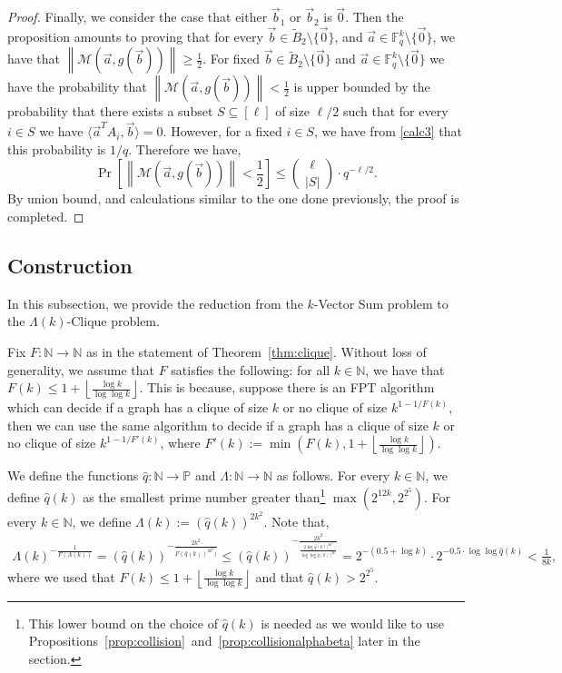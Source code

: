 \documentclass[11pt]{article}
\newcommand{\F}{\mathbb{F}}
\renewcommand{\ge}{ \geqslant}
\renewcommand{\le}{ \leqslant}
\renewcommand{\tilde}{\widetilde}
\newcommand{\M}{\mathcal{M}}
\begin{document}
\begin{proof}
Finally, we consider the case that either $\vec{b}_1$ or $\vec{b}_2$ is $\vec{0}$. Then the proposition amounts to proving that  for every   $\vec{b}\in \tilde{B}_2\setminus\{\vec{0}\}$, and  $\vec{a}\in\F_q^k\setminus\{\vec{0}\}$, we  have that  $\left\|\M\left(\vec{a},g(\vec{b})\right)\right\|\ge \frac{1}{2}$. For fixed   $\vec{b}\in \tilde{B}_2\setminus\{\vec{0}\}$ and  $\vec{a}\in\F_q^k\setminus\{\vec{0}\}$ we have the probability that $\left\|\M\left(\vec{a},g(\vec{b})\right)\right\|< \frac{1}{2}$ is upper bounded by the probability that there exists a subset  $S\subseteq [\ell]$ of size    $\ell /2$ such  that for every $i\in S$ we have $\langle \vec{a}^T A_i, \vec{b}\rangle= 0$. However, for a fixed $i\in S$, we have from \eqref{calc3} that  this probability is $1/q$.
Therefore we have, 
$$\Pr\left[\left\|\M\left(\vec{a},g(\vec{b})\right)\right\|< \frac{1}{2}\right]\le \binom{\ell }{|S|}\cdot q^{-\ell/2}.$$
By union bound, and calculations similar to the one done previously, the proof is completed. 
\end{proof}



 
\subsection{Construction} \label{sec:construction}

In this subsection, we provide the reduction from the $k$-Vector Sum problem to the $\Lambda(k)$-Clique problem. 

Fix $F:\mathbb{N}\to\mathbb{N}$ as in the statement of Theorem~\ref{thm:clique}.
Without loss of generality, we assume that  $F$  satisfies the following:   for all $k\in\mathbb{N}$, we have that $F(k)\le 1+\left\lfloor \frac{\log k}{\log\log k}\right\rfloor$. This is because, suppose there is an FPT algorithm   which can decide if a graph has a clique of size $k$ or no clique of size $k^{1-1/F(k)}$, then we can use the same algorithm to decide if  a graph has a clique of size $k$ or no clique of size $k^{1-1/F'(k)}$, where $F'(k):=\min\left(F(k),1+\left\lfloor \frac{\log k}{\log\log k}\right\rfloor\right)$.

 We define the functions 
$\hat{q}:\mathbb{N}\to\mathbb{P}$ and $\Lambda:\mathbb{N}\to\mathbb{N}$ as follows. For every $k\in\mathbb{N}$, we define $\hat{q}(k)$ as the smallest prime number greater than\footnote{This lower bound on the choice of $\hat{q}(k)$ is needed as we would like to use Propositions~\ref{prop:collision}~and~\ref{prop:collisionalphabeta} later in the section.} $\max\left(2^{12k},2^{2^5}\right)$. For every $k\in\mathbb{N}$, we define $\Lambda(k):=(\hat{q}(k))^{2k^2}$. Note that, 
\begin{align}
	\Lambda(k)^{-\frac{1}{F(\Lambda(k))}}=(\hat{q}(k))^{ -\frac{2k^2}{F(\hat{q}(k))^{2k^2})}}\le (\hat{q}(k))^{ -\frac{2k^2}{\frac{2\log\hat{q}(k))^{2k^2}}{\log\log \hat{q}(k))^{2k^2}}}}= 2^{-(0.5+ \log k)}\cdot 2^{-0.5\cdot \log\log \hat{q}(k)}<  \frac{1}{8k},\label{eqF}
\end{align} 
where we used that  $F(k)\le 1+\left\lfloor \frac{\log k}{\log\log k}\right\rfloor$ and that $\hat{q}(k)>2^{2^5}$. 
 
\end{document}
